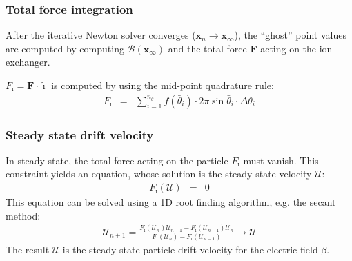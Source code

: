 \documentclass[final]{elsarticle}
\newcommand\bF{\boldsymbol{F}}
\newcommand\bx{\boldsymbol{x}}
\newcommand\cB{\mathcal{B}}
\newcommand\cU{\mathscr{U}}
\newcommand\ui{\boldsymbol{\hat{\imath}}}
\begin{document}
\subsubsection{Total force integration}
After the iterative Newton solver converges ($\bx_n \rightarrow \bx_\infty$), 
the ``ghost'' point values are computed by computing $\cB(\bx_\infty)$ and
the total force $\bF$ acting on the ion-exchanger.

$F_\imath = \bF \cdot \ui$ is computed by using the mid-point quadrature rule:
\begin{eqnarray*}
F_\imath &=& \sum_{i=1}^{n_\theta} f(\bar\theta_i) \cdot 
              2 \pi \sin\bar\theta_i \cdot \Delta\theta_i
\end{eqnarray*}

\subsubsection{Steady state drift velocity}
In steady state, the total force acting on the particle $F_\imath$ must vanish.
This constraint yields an equation, whose solution is the steady-state velocity $\cU$:
\begin{eqnarray*}
F_\imath(\cU) &=& 0
\end{eqnarray*}
This equation can be solved using a 1D root finding algorithm, e.g. the secant method:
\begin{eqnarray*}
\cU_{n+1} = \frac{F_\imath(\cU_{n})\cU_{n-1} - F_\imath(\cU_{n-1})\cU_{n}}
{F_\imath(\cU_{n}) - F_\imath(\cU_{n-1})} \rightarrow \cU
\end{eqnarray*}
The result $\cU$ is the 
steady state particle drift velocity for the electric field $\beta$.



\end{document}
